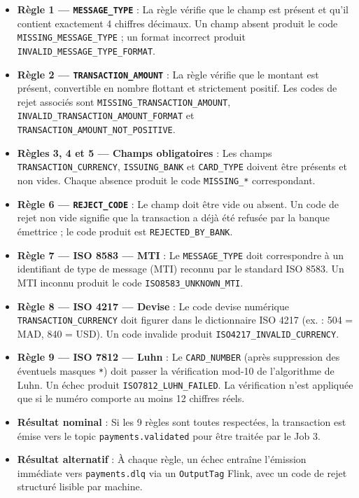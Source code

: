 \begin{itemize}[leftmargin=1.5cm]
    \item \textbf{Règle 1 --- \texttt{MESSAGE\_TYPE}} : La règle vérifie que le champ est présent et qu'il contient exactement 4 chiffres décimaux. Un champ absent produit le code \texttt{MISSING\_MESSAGE\_TYPE} ; un format incorrect produit \texttt{INVALID\_MESSAGE\_TYPE\_FORMAT}.

    \item \textbf{Règle 2 --- \texttt{TRANSACTION\_AMOUNT}} : La règle vérifie que le montant est présent, convertible en nombre flottant et strictement positif. Les codes de rejet associés sont \texttt{MISSING\_TRANSACTION\_AMOUNT}, \texttt{INVALID\_TRANSACTION\_AMOUNT\_FORMAT} et \texttt{TRANSACTION\_AMOUNT\_NOT\_POSITIVE}.

    \item \textbf{Règles 3, 4 et 5 --- Champs obligatoires} : Les champs \texttt{TRANSACTION\_CURRENCY}, \texttt{ISSUING\_BANK} et \texttt{CARD\_TYPE} doivent être présents et non vides. Chaque absence produit le code \texttt{MISSING\_*} correspondant.

    \item \textbf{Règle 6 --- \texttt{REJECT\_CODE}} : Le champ doit être vide ou absent. Un code de rejet non vide signifie que la transaction a déjà été refusée par la banque émettrice ; le code produit est \texttt{REJECTED\_BY\_BANK}.

    \item \textbf{Règle 7 --- ISO 8583 --- MTI} : Le \texttt{MESSAGE\_TYPE} doit correspondre à un identifiant de type de message (MTI) reconnu par le standard ISO 8583. Un MTI inconnu produit le code \texttt{ISO8583\_UNKNOWN\_MTI}.

    \item \textbf{Règle 8 --- ISO 4217 --- Devise} : Le code devise numérique \texttt{TRANSACTION\_CURRENCY} doit figurer dans le dictionnaire ISO 4217 (ex. : 504 = MAD, 840 = USD). Un code invalide produit \texttt{ISO4217\_INVALID\_CURRENCY}.

    \item \textbf{Règle 9 --- ISO 7812 --- Luhn} : Le \texttt{CARD\_NUMBER} (après suppression des éventuels masques \texttt{*}) doit passer la vérification mod-10 de l'algorithme de Luhn. Un échec produit \texttt{ISO7812\_LUHN\_FAILED}. La vérification n'est appliquée que si le numéro comporte au moins 12 chiffres réels.

    \item \textbf{Résultat nominal} : Si les 9 règles sont toutes respectées, la transaction est émise vers le topic \texttt{payments.validated} pour être traitée par le Job 3.

    \item \textbf{Résultat alternatif} : À chaque règle, un échec entraîne l'émission immédiate vers \texttt{payments.dlq} via un \texttt{OutputTag} Flink, avec un code de rejet structuré lisible par machine.
\end{itemize}

